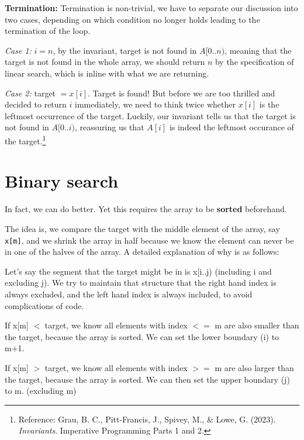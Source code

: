 \textbf{Termination:} Termination is non-trivial, we have to separate our discussion into two cases, depending on which condition no longer holds leading to the termination of the loop.

\textit{Case 1:} $i=n$, by the invariant, target is not found in $A[0..n)$, meaning that the target is not found in the whole array, we should return $n$ by the specification of linear search, which is inline with what we are returning.

\textit{Case 2:} target $ = x[i]$. Target is found! But before we are too thrilled and decided to return $i$ immediately, we need to think twice whether $x[i]$ is the leftmost occurrence of the target. Luckily, our invariant tells us that the target is not found in $A[0..i)$, reassuring us that $A[i]$ is indeed the leftmost occurance of the target.\footnote{Reference: Grau, B. C., Pitt-Francis, J., Spivey, M., \& Lowe, G. (2023). \textit{Invariants}. Imperative Programming Parts 1 and 2.}

\fi
\pagebreak

\section{Binary search}

In fact, we can do better. Yet this requires the array to be \textbf{sorted} beforehand.

The idea is, we compare the target with the middle element of the array, say \texttt{x[m]}, and we shrink the array in half because we know the element can never be in one of the halves of the array. A detailed explanation of why is as follows:
\vspace{6mm}

Let's say the segment that the target might be in is x[i..j) (including i and excluding j). We try to maintain that structure that the right hand index is always excluded, and the left hand index is always included, to avoid complications of code.
\vspace{6mm}

If x[m] $<$ target, we know all elements with index $<=$ m are also smaller than the target, because the array is sorted. We can set the lower boundary (i) to m+1.

If x[m] $>$ target, we know all elements with index $>=$ m are also larger than the target, because the array is sorted. We can then set the upper boundary (j) to m. (excluding m)
\vspace{6mm}

